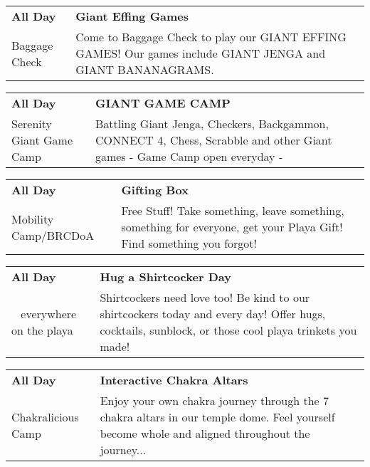 \begin{tabular}{ p{1in} p{2.2in} }
    \textbf{All Day} & \textbf{Giant Effing Games} \\
    Baggage Check \newline  & Come to Baggage Check to play our GIANT EFFING GAMES! Our games include GIANT JENGA and GIANT BANANAGRAMS. \\
    \hline 
\end{tabular}
    
\begin{tabular}{ p{1in} p{2.2in} }
    \textbf{All Day} & \textbf{GIANT GAME CAMP} \\
    Serenity Giant Game Camp \newline  & Battling Giant Jenga, Checkers, Backgammon, CONNECT 4, Chess, Scrabble and other Giant games - Game Camp open everyday - \\
    \hline 
\end{tabular}
    
\begin{tabular}{ p{1in} p{2.2in} }
    \textbf{All Day} & \textbf{Gifting Box} \\
    Mobility Camp/BRCDoA \newline  & Free Stuff! Take something, leave something, something for everyone, get your Playa Gift! Find something you forgot! \\
    \hline 
\end{tabular}
    
\begin{tabular}{ p{1in} p{2.2in} }
    \textbf{All Day} & \textbf{Hug a Shirtcocker Day} \\
    ~ \newline everywhere on the playa & Shirtcockers need love too! Be kind to our shirtcockers today and every day! Offer hugs, cocktails, sunblock, or those cool playa trinkets you made! \\
    \hline 
\end{tabular}
    
\begin{tabular}{ p{1in} p{2.2in} }
    \textbf{All Day} & \textbf{Interactive Chakra Altars} \\
    Chakralicious Camp \newline  & Enjoy your own chakra journey through the 7 chakra altars in our temple dome. Feel yourself become whole and aligned throughout the journey... \\
    \hline 
\end{tabular}
    
